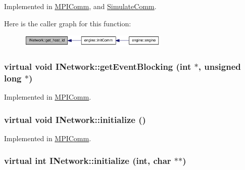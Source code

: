 Implemented in \hyperlink{class_m_p_i_comm_a856e93fd17d9e20104590440088b4049}{MPIComm}, and \hyperlink{class_simulate_comm_a0cc18f43f08d707c300466e9e1a59184}{SimulateComm}.

Here is the caller graph for this function:\nopagebreak
\begin{figure}[H]
\begin{center}
\leavevmode
\includegraphics[width=202pt]{class_i_network_aef01bb260a8e60c7c9085b381cf86f13_icgraph}
\end{center}
\end{figure}
\hypertarget{class_i_network_a062d228ccf152a98c8255bda414d956d}{
\subsubsection[{getEventBlocking}]{\setlength{\rightskip}{0pt plus 5cm}virtual void INetwork::getEventBlocking (int $\ast$, \/  unsigned long $\ast$)}}
\label{class_i_network_a062d228ccf152a98c8255bda414d956d}


Implemented in \hyperlink{class_m_p_i_comm_a973e8bc1426f2ac24f86036909eb2407}{MPIComm}.\hypertarget{class_i_network_a6a9104cce9246feb6b8fc08b15e7c171}{
\subsubsection[{initialize}]{\setlength{\rightskip}{0pt plus 5cm}virtual void INetwork::initialize ()}}
\label{class_i_network_a6a9104cce9246feb6b8fc08b15e7c171}


Implemented in \hyperlink{class_m_p_i_comm_aa21508c017028ad002b01cdecc10a247}{MPIComm}.\hypertarget{class_i_network_a5c706262a4275f321687a189686a2b81}{
\subsubsection[{initialize}]{\setlength{\rightskip}{0pt plus 5cm}virtual int INetwork::initialize (int, \/  char $\ast$$\ast$)}}
\label{class_i_network_a5c706262a4275f321687a189686a2b81}


